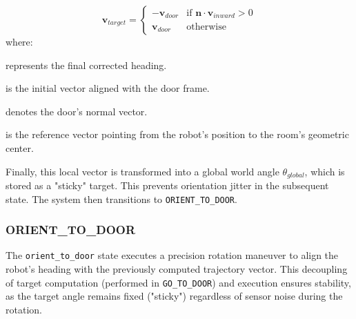 \documentclass[conference]{IEEEtran}
\begin{document}
\begin{enumerate}
    \begin{equation}
        \mathbf{v}_{target} = 
        \begin{cases} 
        -\mathbf{v}_{door} & \text{if } \mathbf{n} \cdot \mathbf{v}_{inward} > 0 \\
        \mathbf{v}_{door} & \text{otherwise}
        \end{cases}
    \end{equation}
    \noindent where:
    \begin{description}[labelsep=0.4cm] 
        \item[$\mathbf{v}_{target}$] represents the final corrected heading.
        \item[$\mathbf{v}_{door}$] is the initial vector aligned with the door frame.
        \item[$\mathbf{n}$] denotes the door's normal vector.
        \item[$\mathbf{v}_{inward}$] is the reference vector pointing from the robot's position to the room's geometric center.
    \end{description}
    \end{enumerate}

    Finally, this local vector is transformed into a global world angle $\theta_{global}$, which is stored as a "sticky" target. This prevents orientation jitter in the subsequent state. The system then transitions to \texttt{ORIENT\_TO\_DOOR}.

    \subsubsection{ORIENT\_TO\_DOOR}
    The \texttt{orient\_to\_door} state executes a precision rotation maneuver to align the robot's heading with the previously computed trajectory vector. This decoupling of target computation (performed in \texttt{GO\_TO\_DOOR}) and execution ensures stability, as the target angle remains fixed ("sticky") regardless of sensor noise during the rotation.
    
\end{document}
